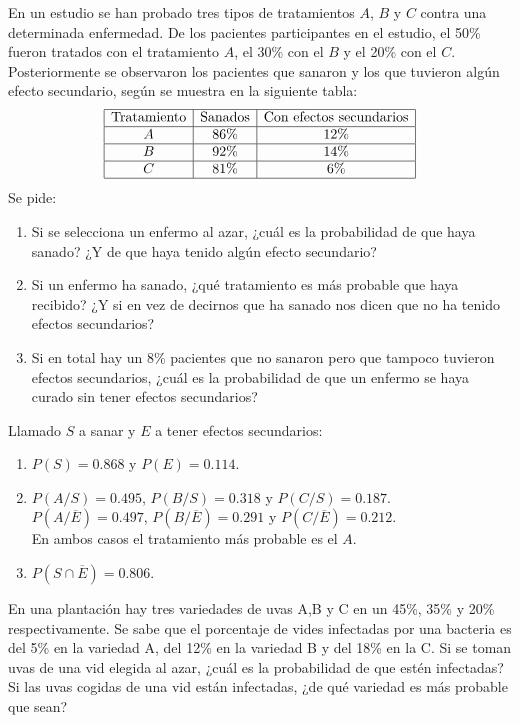 {En un estudio se han probado tres tipos de tratamientos $A$, $B$ y $C$ contra una determinada enfermedad. De los
pacientes participantes en el estudio, el 50\% fueron tratados con el tratamiento $A$, el 30\% con el $B$ y el 20\% con
el $C$.
Posteriormente se observaron los pacientes que sanaron y los que tuvieron algún efecto secundario, según se
muestra en la siguiente tabla:
\[
\begin{array}{|c|c|c|c|}
\hline
\text{Tratamiento} & \text{Sanados} & \text{Con efectos secundarios} \\
\hline
A & 86\% & 12\% \\
\hline
B & 92\% & 14\% \\
\hline
C & 81\% &  6\% \\
\hline
\end{array}
\]
Se pide:
\begin{enumerate}
\item Si se selecciona un enfermo al azar, ¿cuál es la probabilidad de que haya sanado?
¿Y de que haya tenido algún efecto secundario? 
\item Si un enfermo ha sanado, ¿qué tratamiento es más probable que haya recibido?
¿Y si en vez de decirnos que ha sanado nos dicen que no ha tenido efectos secundarios?
\item Si en total hay un 8\% pacientes que no sanaron pero que tampoco tuvieron efectos secundarios, ¿cuál es la
probabilidad de que un enfermo se haya curado sin tener efectos secundarios?
\end{enumerate}
}
{Llamado $S$ a sanar y $E$ a tener efectos secundarios:
\begin{enumerate}
\item $P(S)=0.868$ y $P(E)=0.114$.
\item $P(A/S)=0.495$, $P(B/S)=0.318$ y $P(C/S)=0.187$.\\
$P(A/\overline{E})=0.497$, $P(B/\overline{E})=0.291$ y $P(C/\overline{E})=0.212$.\\
En ambos casos el tratamiento más probable es el $A$.
\item $P(S\cap \overline{E})=0.806$.
\end{enumerate}
}
{}


{En una plantación hay tres variedades de uvas A,B y C en un 45\%, 35\% y 20\% respectivamente. Se sabe que el porcentaje de vides infectadas por una bacteria es del 5\% en la variedad A, del 12\% en la variedad B y del 18\% en la C. Si se toman uvas de una vid elegida al azar, ¿cuál es la probabilidad de que estén infectadas? Si las uvas cogidas de una vid están infectadas, ¿de qué variedad es más probable que sean?
}
{}
{}


